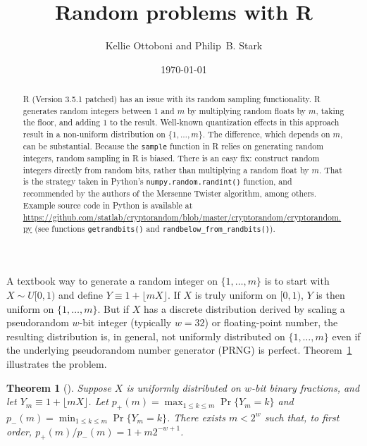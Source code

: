 \documentclass[12pt]{article}
\title{Random problems with R}
\author{Kellie Ottoboni and Philip~B. Stark}
\date{\today}
\newtheorem{theorem}{Theorem}
\begin{document}
\maketitle


\begin{abstract}
\noindent R (Version 3.5.1 patched) has an issue with its random sampling functionality.
R generates random integers between $1$ and $m$
by multiplying random floats by $m$, taking the floor, and adding $1$ to the result.
Well-known quantization effects in this approach result in a 
non-uniform distribution on $\{ 1, \ldots, m\}$.
The difference, which depends on $m$, can be substantial.
Because the \texttt{sample} function in R relies on generating random integers,
random sampling in R is biased.
There is an easy fix: construct random integers directly from random bits, rather than
multiplying a random float by $m$.
That is the strategy taken in Python's \texttt{numpy.random.randint()} function, 
and recommended by the authors of the Mersenne Twister algorithm, among
others.
Example source code in Python is available at \url{https://github.com/statlab/cryptorandom/blob/master/cryptorandom/cryptorandom.py} (see functions \texttt{getrandbits()} and \texttt{randbelow\_from\_randbits()}).
\end{abstract}



A textbook way to generate a random integer on 
$\{1, \dots, m\}$ is to start with $X \sim U[0,1)$ and define $Y \equiv 1 + \lfloor mX \rfloor$. 
If $X$ is truly uniform on $[0,1)$, $Y$ is then uniform on $\{1, \dots, m\}$.
But if $X$ has a discrete distribution derived by scaling a pseudorandom $w$-bit integer
(typically $w=32$) or floating-point number, 
the resulting distribution is, in general, not uniformly distributed on 
$\{1, \ldots, m \}$ even if the underlying pseudorandom number generator 
(PRNG) is perfect.
Theorem~\ref{thm:theorem_1} illustrates the problem.

\begin{theorem}[\citet{knuth_art_1997}] %
\label{thm:theorem_1}
Suppose $X$ is uniformly distributed on $w$-bit binary fractions, and
let $Y_m \equiv 1 + \lfloor mX \rfloor$.
Let $p_+(m) = \max_{1 \le k \le m} \Pr\{Y_m = k\}$ and $p_-(m) = \min_{1 \le k \le m} \Pr\{Y_m = k\}$.
There exists $m < 2^w$ such that, to first order, 
$p_+(m)/p_-(m) = 1 + m2^{-w+1}$.
\end{theorem}
\end{document}
